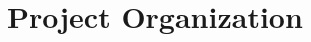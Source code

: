 \documentclass[10pt, fleqn]{beamer}
\begin{document}
    
  

    
  








\section{Project Organization}

\end{document}
